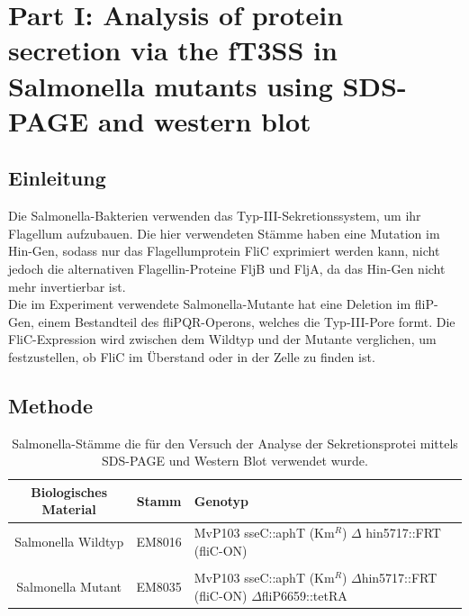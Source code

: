 \documentclass[oneside,10pt,a4paper]{report}
\begin{document}
		\section{Part I: Analysis of protein secretion via the fT3SS in Salmonella mutants using SDS-PAGE and western blot}
		
		\subsection{Einleitung}
		Die Salmonella-Bakterien verwenden das Typ-III-Sekretionssystem, um ihr Flagellum aufzubauen. Die hier verwendeten Stämme haben eine Mutation im Hin-Gen, sodass nur das Flagellumprotein FliC exprimiert werden kann, nicht jedoch die alternativen Flagellin-Proteine FljB und FljA, da das Hin-Gen nicht mehr invertierbar ist.\\
		Die im Experiment verwendete Salmonella-Mutante hat eine Deletion im fliP-Gen, einem Bestandteil des fliPQR-Operons, welches die Typ-III-Pore formt. Die FliC-Expression wird zwischen dem Wildtyp und der Mutante verglichen, um festzustellen, ob FliC im Überstand oder in der Zelle zu finden ist.
		
		\subsection{Methode}
			\begin{table}[H]
				\centering
				\caption{Salmonella-Stämme die für den Versuch der Analyse der Sekretionsprotei mittels SDS-PAGE und Western Blot verwendet wurde.}
				\label{tab: exp6-biologisches Material part1}
				\begin{tabular}{ccp{7.5cm}}
					\toprule
					Biologisches Material& Stamm & Genotyp\\
					\midrule
					\multirow{2}{*}{\parbox[t]{2cm}{Salmonella Wildtyp}}  & \multirow{2}{*}{EM8016} & \multirow{2}{*}{\parbox[t]{7.5cm}{MvP103 sseC::aphT (Km$^R$) $\Delta$ hin5717::FRT (fliC-ON)}}\\
					&&\\
					&&\\
					\multirow{3}{*}{\parbox[t]{2cm}{Salmonella Mutant}} & \multirow{3}{*}{EM8035} &\multirow{3}{*}{\parbox[t]{7.5cm}{MvP103 sseC::aphT (Km$^R$) $\Delta$hin5717::FRT (fliC-ON) $\Delta$fliP6659::tetRA}} \\
					&&\\
					&&\\
					
					\bottomrule			
				\end{tabular}
			\end{table}
			
\end{document}
